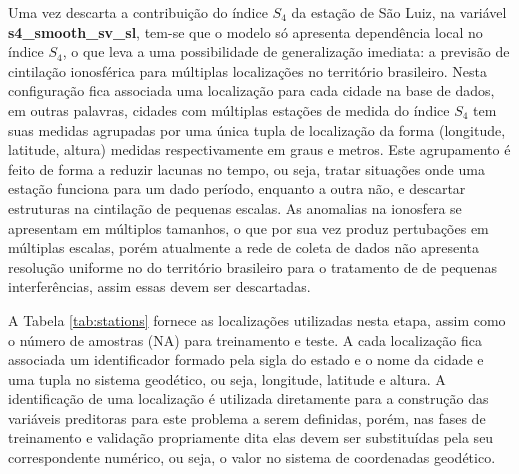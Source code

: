 Uma vez descarta a contribuição do índice $S_4$ da estação de São Luiz, na variável {\bf s4\_smooth\_sv\_sl}, tem-se que o modelo só apresenta dependência local no índice $S_4$, o que leva a uma possibilidade de generalização imediata: a previsão de cintilação ionosférica para múltiplas localizações no território brasileiro. Nesta configuração fica associada uma localização para cada cidade na base de dados, em outras palavras, cidades com múltiplas estações de medida do índice $S_4$ tem suas medidas agrupadas por uma única tupla de localização da forma (longitude, latitude, altura) medidas respectivamente em graus e metros. Este agrupamento é feito de forma a reduzir lacunas no tempo, ou seja, tratar situações onde uma estação funciona para um dado período, enquanto a outra não, e descartar estruturas na cintilação de pequenas escalas. As anomalias na ionosfera se apresentam em múltiplos tamanhos, o que por sua vez produz pertubações em múltiplas escalas, porém atualmente a rede de coleta de dados não apresenta resolução uniforme no do território brasileiro para o tratamento de de pequenas interferências, assim essas devem ser descartadas.

A Tabela \ref{tab:stations} fornece as localizações utilizadas nesta etapa, assim como o número de amostras (NA) para treinamento e teste. A cada localização fica associada um identificador formado pela sigla do estado e o nome da cidade e uma tupla no sistema geodético, ou seja, longitude, latitude e altura. A identificação de uma localização é utilizada diretamente para a construção das variáveis preditoras para este problema a serem definidas, porém, nas fases de treinamento e validação propriamente dita elas devem ser substituídas pela seu correspondente numérico, ou seja, o valor no sistema de coordenadas geodético.

